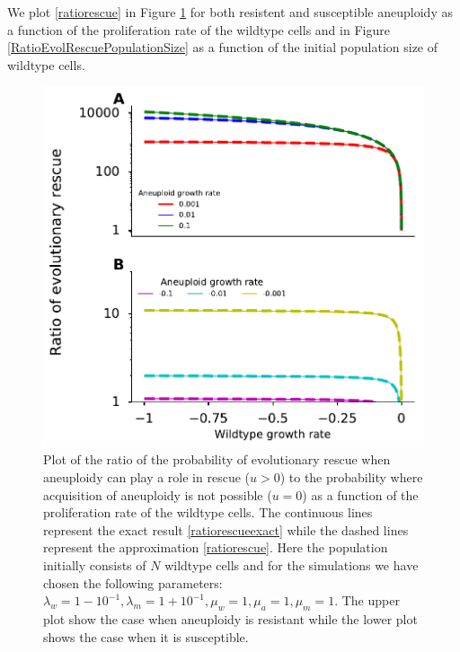 \documentclass[12pt]{extarticle}
\begin{document}
We plot \eqref{ratiorescue} in Figure \ref{RatioEvolRescue} for both resistent and susceptible aneuploidy as a function of the proliferation rate of the wildtype cells and in Figure \ref{RatioEvolRescuePopulationSize} as a function of the initial population size of wildtype cells.
\begin{figure}[!t]
 \vspace*{1\baselineskip}
\includegraphics[width=1\textwidth]{Figures/RatioEvolRescue.pdf}
\caption{Plot of the ratio of the probability of evolutionary rescue when aneuploidy can play a role in rescue ($u>0$) to the probability where acquisition of aneuploidy is not possible ($u=0$) as a function of the proliferation rate of the wildtype cells. The continuous lines represent the exact result \eqref{ratiorescueexact} while the dashed lines represent the approximation \eqref{ratiorescue}.  Here the population initially consists of $N$ wildtype cells and for the simulations we have chosen the following parameters: $\lambda_w=1-10^{-1},\lambda_m=1+10^{-1},\mu_w=1,\mu_a=1,\mu_m=1$. The upper plot show the case when aneuploidy is resistant while the lower plot shows the case when it is susceptible.}
\label{RatioEvolRescue}
\end{figure}
\end{document}
